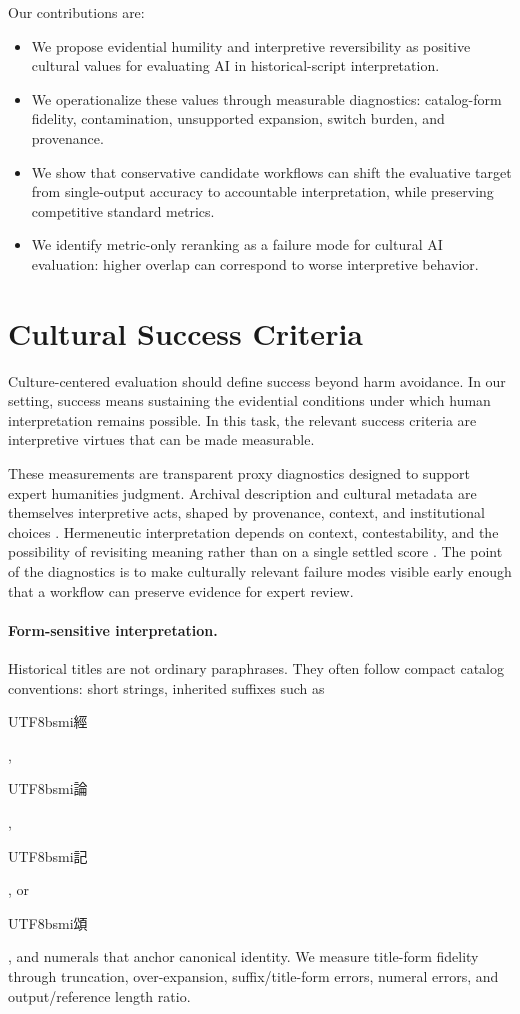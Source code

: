 \documentclass{article}
\newcommand{\zh}[1]{{\begin{CJK*}{UTF8}{bsmi}#1\end{CJK*}}}
\begin{document}
Our contributions are:
\begin{itemize}
    \item We propose evidential humility and interpretive reversibility as positive cultural values for evaluating AI in historical-script interpretation.
    \item We operationalize these values through measurable diagnostics: catalog-form fidelity, contamination, unsupported expansion, switch burden, and provenance.
    \item We show that conservative candidate workflows can shift the evaluative target from single-output accuracy to accountable interpretation, while preserving competitive standard metrics.
    \item We identify metric-only reranking as a failure mode for cultural AI evaluation: higher overlap can correspond to worse interpretive behavior.
\end{itemize}

\section{Cultural Success Criteria}

Culture-centered evaluation should define success beyond harm avoidance. In our setting, success means sustaining the evidential conditions under which human interpretation remains possible. In this task, the relevant success criteria are interpretive virtues that can be made measurable.

These measurements are transparent proxy diagnostics designed to support expert humanities judgment. Archival description and cultural metadata are themselves interpretive acts, shaped by provenance, context, and institutional choices \citep{bowker1999sorting,gilliland2016setting}. Hermeneutic interpretation depends on context, contestability, and the possibility of revisiting meaning rather than on a single settled score \citep{ricoeur1976interpretation}. The point of the diagnostics is to make culturally relevant failure modes visible early enough that a workflow can preserve evidence for expert review.

\paragraph{Form-sensitive interpretation.}
Historical titles are not ordinary paraphrases. They often follow compact catalog conventions: short strings, inherited suffixes such as \zh{經}, \zh{論}, \zh{記}, or \zh{頌}, and numerals that anchor canonical identity. We measure title-form fidelity through truncation, over-expansion, suffix/title-form errors, numeral errors, and output/reference length ratio.
\end{document}
